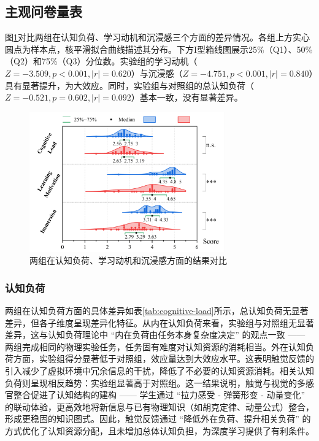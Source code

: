 \documentclass[runningheads]{llncs}
\begin{document}
\subsection{主观问卷量表}
图\ref{fig:user-experience-result}对比两组在认知负荷、学习动机和沉浸感三个方面的差异情况。各组上方实心圆点为样本点，核平滑拟合曲线描述其分布。下方I型箱线图展示25\%（Q1）、50\%（Q2）和75\%（Q3）分位数。实验组的学习动机（$Z=-3.509,p<0.001,|r|=0.620$）与沉浸感（$Z=-4.751,p<0.001,|r|=0.840$）具有显著提升，为大效应。同时，实验组与对照组的总认知负荷（$Z=-0.521,p=0.602,|r|=0.092$）基本一致，没有显著差异。

\begin{figure}[t]
  \centering
  \includegraphics[width=0.75\textwidth]{image/user-experience-result.pdf}
  \caption{两组在认知负荷、学习动机和沉浸感方面的结果对比}
  \label{fig:user-experience-result}
\end{figure}

\subsubsection{认知负荷}
两组在认知负荷方面的具体差异如表\ref{tab:cognitive-load}所示，总认知负荷无显著差异，但各子维度呈现差异化特征。从内在认知负荷来看，实验组与对照组无显著差异，这与认知负荷理论中 “内在负荷由任务本身复杂度决定” 的观点一致 —— 两组完成相同的物理实验任务，任务固有难度对认知资源的消耗相当。外在认知负荷方面，实验组得分显著低于对照组，效应量达到大效应水平。这表明触觉反馈的引入减少了虚拟环境中冗余信息的干扰，降低了不必要的认知资源消耗。相关认知负荷则呈现相反趋势：实验组显著高于对照组。这一结果说明，触觉与视觉的多感官整合促进了认知结构的建构 —— 学生通过 “拉力感受 - 弹簧形变 - 动量变化” 的联动体验，更高效地将新信息与已有物理知识（如胡克定律、动量公式）整合，形成更稳固的知识图式。因此，触觉反馈通过 “降低外在负荷、提升相关负荷” 的方式优化了认知资源分配，且未增加总体认知负担，为深度学习提供了有利条件。
\end{document}

